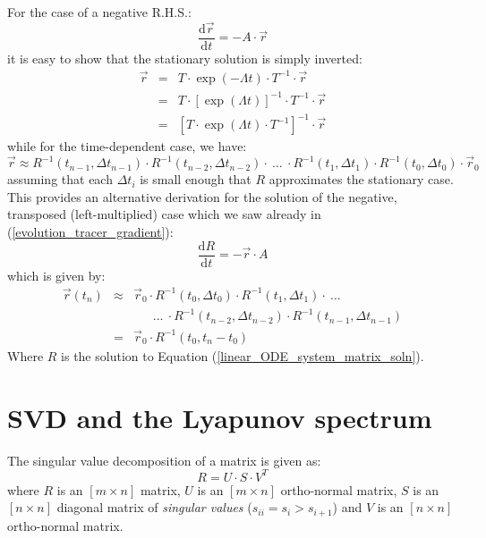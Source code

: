 \documentclass[11pt]{article}
\begin{document}
For the case of a negative R.H.S.:
\begin{equation}
\frac{\mathrm d \vec r}{\mathrm d t} = - A \cdot \vec r
\end{equation}
it is easy to show that the stationary solution is simply inverted:
\begin{eqnarray}
  \vec r & = & T \cdot \exp (-\Lambda t) \cdot T^{-1} \cdot \vec r \\
	& = & T \cdot \left [ \exp (\Lambda t) \right ]^{-1} \cdot T^{-1} \cdot \vec r \\
 & = & \left [T \cdot \exp (\Lambda t) \cdot T^{-1} \right]^{-1} \cdot \vec r 
\end{eqnarray}
while for the time-dependent case, we have:
\begin{equation}
\vec r \approx R^{-1}(t_{n-1},\Delta t_{n-1}) \cdot R^{-1}(t_{n-2}, \Delta t_{n-2}) \cdot ~ ... 
~ \cdot R^{-1}(t_1,\Delta t_1) \cdot R^{-1}(t_0,\Delta t_0) \cdot \vec r_0
\end{equation}
assuming that each $\Delta t_i$ is small enough that $R$ approximates the 
stationary case.
This provides an alternative derivation for the solution of the negative,
transposed (left-multiplied) case which we saw already in (\ref{evolution_tracer_gradient}):
\begin{equation}
\frac{\mathrm d R}{\mathrm d t} = -\vec r \cdot A
\end{equation}
which is given by:
\begin{eqnarray}
\vec r(t_n) & \approx & \vec r_0 \cdot R^{-1}(t_0,\Delta t_0) \cdot R^{-1}(t_1, \Delta t_1) \cdot ~ ... 
~ \nonumber \\
& & ~~~~~~~...~\cdot R^{-1}(t_{n-2},\Delta t_{n-2}) \cdot R^{-1}(t_{n-1},\Delta t_{n-1}) \\
& = & \vec r_0 \cdot R^{-1}(t_0, t_n-t_0)
\end{eqnarray}
Where $R$ is the solution to Equation (\ref{linear_ODE_system_matrix_soln}).

\section{SVD and the Lyapunov spectrum}

The singular value decomposition of a matrix is given as:
\begin{equation}
R=U\cdot S\cdot V^T
\label{SVD_def}
\end{equation}
where $R$ is an $[m \times n]$ matrix, $U$ is an $[m \times n]$ ortho-normal
matrix, $S$ is an $[n \times n]$ diagonal matrix of {\it singular values}
($s_{ii}=s_i>s_{i+1}$) and $V$ is an $[n \times n]$ ortho-normal matrix.
\end{document}
